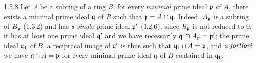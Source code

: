 \documentclass[../main.tex]{subfiles}
\begin{document}
\begin{cx}{1.5.8}
Let $A$ be a subring of a ring $B$; for every \emph{minimal} prime ideal $\mathfrak{p}$ of $A$, there
exists a minimal prime ideal $\mathfrak{q}$ of $B$ such that $\mathfrak{p}=A\cap\mathfrak{q}$. Indeed, $A_\mathfrak{p}$
is a subring of $B_\mathfrak{p}$ (1.3.2) and has \emph{a single} prime ideal $\mathfrak{p}'$ (1.2.6); since
$B_\mathfrak{p}$ is not reduced to $0$, it has at least one prime ideal $\mathfrak{q}'$ and we have
necessarily $\mathfrak{q}'\cap A_\mathfrak{p}=\mathfrak{p}'$; the prime ideal $\mathfrak{q}_1$ of $B$, a reciprocal image
of $\mathfrak{q}'$ is thus such that $\mathfrak{q}_1\cap A=\mathfrak{p}$, and $\emph{a fortiori}$ we have
$\mathfrak{q}\cap A=\mathfrak{p}$ for every minimal prime ideal $\mathfrak{q}$ of $B$ contained in $\mathfrak{q}_1$.
\end{cx}
\end{document}
